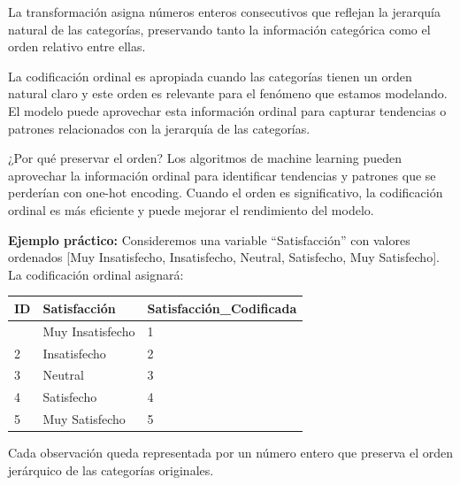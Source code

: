 \documentclass[
  letterpaper,
  DIV=11,
  numbers=noendperiod]{scrreprt}
\begin{document}
La transformación asigna números enteros consecutivos que reflejan la
jerarquía natural de las categorías, preservando tanto la información
categórica como el orden relativo entre ellas.

\begin{tcolorbox}[enhanced jigsaw, leftrule=.75mm, breakable, colbacktitle=quarto-callout-warning-color!10!white, bottomrule=.15mm, colframe=quarto-callout-warning-color-frame, toprule=.15mm, colback=white, coltitle=black, bottomtitle=1mm, left=2mm, title=\textcolor{quarto-callout-warning-color}{\faExclamationTriangle}\hspace{0.5em}{Cuándo usar codificación ordinal}, opacityback=0, arc=.35mm, opacitybacktitle=0.6, toptitle=1mm, titlerule=0mm, rightrule=.15mm]

La codificación ordinal es apropiada cuando las categorías tienen un
orden natural claro y este orden es relevante para el fenómeno que
estamos modelando. El modelo puede aprovechar esta información ordinal
para capturar tendencias o patrones relacionados con la jerarquía de las
categorías.

\end{tcolorbox}

¿Por qué preservar el orden? Los algoritmos de machine learning pueden
aprovechar la información ordinal para identificar tendencias y patrones
que se perderían con one-hot encoding. Cuando el orden es significativo,
la codificación ordinal es más eficiente y puede mejorar el rendimiento
del modelo.

\textbf{Ejemplo práctico:} Consideremos una variable ``Satisfacción''
con valores ordenados {[}Muy Insatisfecho, Insatisfecho, Neutral,
Satisfecho, Muy Satisfecho{]}. La codificación ordinal asignará:

\begin{longtable}[]{@{}lll@{}}
\toprule\noalign{}
\textbf{ID} & \textbf{Satisfacción} &
\textbf{Satisfacción\_Codificada} \\
\midrule\noalign{}
\endhead
\bottomrule\noalign{}
\endlastfoot
1 & Muy Insatisfecho & 1 \\
2 & Insatisfecho & 2 \\
3 & Neutral & 3 \\
4 & Satisfecho & 4 \\
5 & Muy Satisfecho & 5 \\
\end{longtable}

Cada observación queda representada por un número entero que preserva el
orden jerárquico de las categorías originales.
\end{document}
